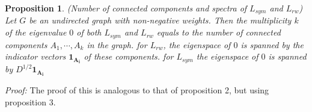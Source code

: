 \documentclass[10pt,a4paper, nocenter]{report}
\newtheorem{prop}{Proposition}
\begin{document}
    \begin{prop}
        (Number of connected components and spectra of $L_{sym}$ and $L_{rw}$) Let $G$ be an undirected graph with non-negative weights. Then the multiplicity $k$ of the eigenvalue $0$ of both $L_{sym}$ and $L_{rw}$ equals to the number of connected components $A_{1},\cdots,A_{k}$ in the graph. for $L_{rw}$, the eigenspace of $0$ is spanned by the indicator vectors $\mathbf{1_{A_{i}}}$ of these components. for $L_{sym}$ the eigenspace of $0$ is spanned by $D^{1/2}\mathbf{1_{A_{i}}}$
    \end{prop}
    \textit{Proof:} The proof of this is analogous to that of proposition 2, but using proposition 3.


	\nocite{govl:96, parlet:98,stsu:90,gene:2018}
	
	\thispagestyle{fancy}
	
	 
	
\end{document}
